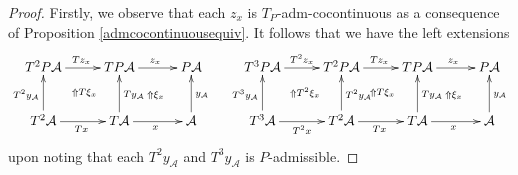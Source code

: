 \documentclass[a4paper,oneside,english]{amsart}
\numberwithin{equation}{section}
\numberwithin{figure}{section}
\theoremstyle{plain}
\theoremstyle{definition}
\theoremstyle{remark}
\theoremstyle{definition}
\theoremstyle{plain}
\theoremstyle{plain}
\theoremstyle{plain}
\begin{document}
\begin{proof}
Firstly, we observe that each $z_{x}$ is $T_{P}$-adm-cocontinuous
as a consequence of Proposition \ref{admcocontinuousequiv}. It follows
that we have the left extensions 
\[
\xymatrix@=1em{T^{2}P\mathcal{A}\ar[rr]^{Tz_{x}} &  & TP\mathcal{A}\ar@{}[dldl]|-{\Uparrow T\xi_{x}}\ar[rr]^{z_{x}}\ar@{}[ddrr]|-{\Uparrow\xi_{x}} &  & P\mathcal{A} &  & T^{3}P\mathcal{A}\ar[rr]^{T^{2}z_{x}} &  & T^{2}P\mathcal{A}\ar[rr]^{Tz_{x}}\ar@{}[dldl]|-{\Uparrow T^{2}\xi_{x}} &  & TP\mathcal{A}\ar@{}[dldl]|-{\Uparrow T\xi_{x}}\ar[rr]^{z_{x}}\ar@{}[ddrr]|-{\Uparrow\xi_{x}} &  & P\mathcal{A}\\
 &  &  & \; &  &  &  &  &  &  &  & \;\\
T^{2}\mathcal{A}\ar[rr]_{Tx}\ar[uu]^{T^{2}y_{\mathcal{A}}} &  & T\mathcal{A}\ar[uu]_{Ty_{\mathcal{A}}}\ar[rr]_{x} &  & \mathcal{A}\ar[uu]_{y_{\mathcal{A}}} &  & T^{3}\mathcal{A}\ar[rr]_{T^{2}x}\ar[uu]^{T^{3}y_{\mathcal{A}}} &  & T^{2}\mathcal{A}\ar[rr]_{Tx}\ar[uu]_{T^{2}y_{\mathcal{A}}} &  & T\mathcal{A}\ar[uu]_{Ty_{\mathcal{A}}}\ar[rr]_{x} &  & \mathcal{A}\ar[uu]_{y_{\mathcal{A}}}
}
\]
upon noting that each $T^{2}y_{\mathcal{A}}$ and $T^{3}y_{\mathcal{A}}$
is $P$-admissible. 


\end{proof}
\end{document}
